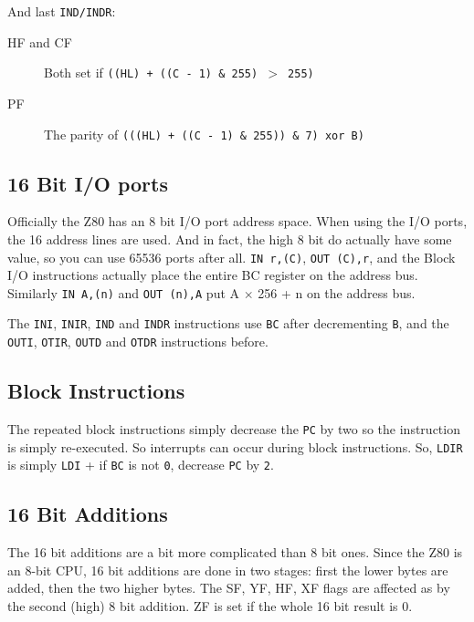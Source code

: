 \documentclass[12pt,twoside,openright,a4paper]{book}
\begin{document}
And last {\tt IND/INDR}:

\begin{description}

	\item[HF and CF]
	Both set if {\tt ((HL) + ((C - 1) \& 255) $>$ 255)}

	\item[PF]
	The parity of {\tt (((HL) + ((C - 1) \& 255)) \& 7) xor B)}

\end{description}


\subsection{16 Bit I/O ports}

Officially the Z80 has an 8 bit I/O port address space. When using the I/O ports, the 16 address lines are used. And in fact, the high 8 bit do actually have some value, so you can use 65536 ports after all. {\tt IN r,(C)}, {\tt OUT (C),r}, and the Block I/O instructions  actually place the entire BC register on the address bus. Similarly {\tt IN A,(n)} and {\tt OUT (n),A} put A $\times$ 256 + n on the address bus.

The {\tt INI}, {\tt INIR}, {\tt IND} and {\tt INDR} instructions use {\tt BC} after decrementing {\tt B}, and the {\tt OUTI}, {\tt OTIR}, {\tt OUTD} and {\tt OTDR} instructions before.


\subsection{Block Instructions}

The repeated block instructions simply decrease the {\tt PC} by two so the instruction is simply re-executed. So interrupts can occur during block instructions. So, {\tt LDIR} is simply {\tt LDI} + if {\tt BC} is not {\tt 0}, decrease {\tt PC} by {\tt 2}.


\subsection{16 Bit Additions}

The 16 bit additions are a bit more complicated than 8 bit ones. Since the Z80 is an 8-bit CPU, 16 bit additions are done in two stages: first the lower bytes are added, then the two higher bytes. The SF, YF, HF, XF flags are affected as by the second (high) 8 bit addition. ZF is set if the whole 16 bit result is 0.
\end{document}

